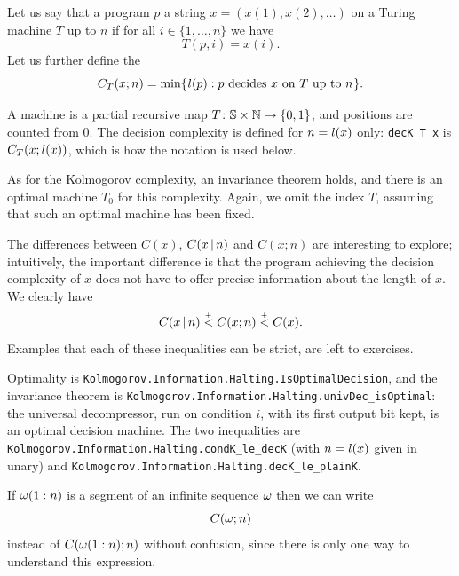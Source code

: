  \begin{definition}
  \label{def:g3.2.1}
  \leanok
Let us say that a program \( p \)  a string \( x = (x(1),x(2),\dotsc) \)
on a Turing machine \( T \) up to \( n \) if for all \( i \in \{1,\dots,n\} \) we have
 \[
   T(p,i) = x(i).
 \]
Let us further define the 
 \[
   C_{T}(x; n) = \min\mathopen\{\mskip 1mul(p) : p \text{ decides \( x \) on \( T \) up to \( n \)}\mskip 1mu\mathclose\}.
 \]
 \end{definition}

\begin{formalization}
A machine is a partial recursive map \( T \colon \mathbb{S} \times \mathbb{N} \to \{0, 1\} \), and positions are
counted from \( 0 \). The decision complexity is defined for \( n = l(x) \) only:
\texttt{decK T x} is \( C_{T}(x; l(x)) \), which is how the notation is used below.
\end{formalization}

As for the Kolmogorov complexity, an invariance theorem holds, and there is
an optimal machine \( T_{0} \) for this complexity.
Again, we omit the index \( T \), assuming that such an optimal machine has
been fixed.

The differences between \( C(x) \), \( C(x \,\vert\, n) \) and \( C(x ; n) \) are
interesting to explore; intuitively, the important difference is that the
program achieving the decision complexity of \( x \) does not have to offer
precise information about the length of \( x \).
We clearly have
 \[
   C(x \,\vert\, n) \stackrel{{}_+}{<} C(x ; n) \stackrel{{}_+}{<} C(x).
 \]
Examples that each of these inequalities can be strict, are left to
exercises.

\begin{formalization}
Optimality is \texttt{Kolmogorov.Information.Halting.IsOptimalDecision}, and the invariance
theorem is \texttt{Kolmogorov.Information.Halting.univDec\_isOptimal}: the universal
decompressor, run on condition \( i \), with its first output bit kept, is an optimal decision
machine. The two inequalities are
\texttt{Kolmogorov.Information.Halting.condK\_le\_decK} (with \( n = l(x) \) given in
unary) and \texttt{Kolmogorov.Information.Halting.decK\_le\_plainK}.
\end{formalization}

 \begin{remark}
  \label{rem:g3.2.2}
If \( \omega(1:n) \) is a segment of an infinite sequence \( \omega \) then we can write
 \[
   C(\omega ; n)
 \]
instead of \( C(\omega(1:n) ; n) \) without confusion, since there is only one way
to understand this expression.
 \end{remark}

